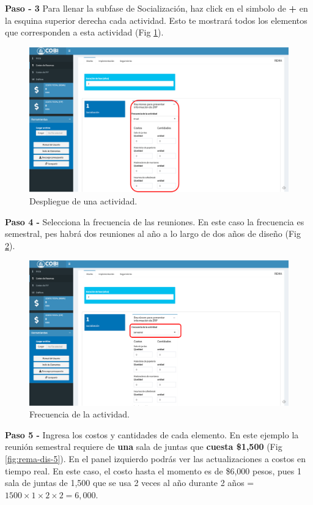 \documentclass[
]{book}
\begin{document}
\textbf{Paso - 3 } Para llenar la subfase de Socialización, haz click en el simbolo de \textbf{+} en la esquina superior derecha cada actividad. Esto te mostrará todos los elementos que corresponden a esta actividad (Fig \ref{fig:rem-dis-3}).

\begin{figure}
\includegraphics[width=61.11in]{images/rema_dis_3} \caption{Despliegue de una actividad.}\label{fig:rem-dis-3}
\end{figure}

\textbf{Paso 4 - } Selecciona la frecuencia de las reuniones. En este caso la frecuencia es semestral, pes habrá dos reuniones al año a lo largo de dos años de diseño (Fig \ref{fig:rem-dis-4}).

\begin{figure}
\includegraphics[width=61.11in]{images/rema_dis_4} \caption{Frecuencia de la actividad.}\label{fig:rem-dis-4}
\end{figure}

\textbf{Paso 5 - } Ingresa los costos y cantidades de cada elemento. En este ejemplo la reunión semestral requiere de \textbf{una} sala de juntas que \textbf{cuesta \$1,500} (Fig \ref{fig:rema-dis-5}). En el panel izquierdo podrás ver las actualizaciones a costos en tiempo real. En este caso, el costo hasta el momento es de \$6,000 pesos, pues 1 sala de juntas de 1,500 que se usa 2 veces al año durante 2 años = \(1500 \times 1 \times 2 \times 2 = 6,000\).
\end{document}
